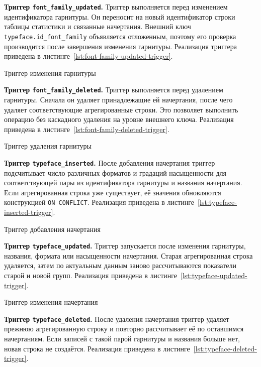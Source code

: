 \textbf{Триггер \texttt{font_family_updated}.}
Триггер выполняется перед изменением идентификатора гарнитуры. Он переносит на
новый идентификатор строки таблицы статистики и связанные начертания. Внешний
ключ \texttt{typeface.id_font_family} объявляется отложенным, поэтому
его проверка производится после завершения изменения гарнитуры. Реализация
триггера приведена в листинге~\ref{lst:font-family-updated-trigger}.

{Триггер изменения гарнитуры}
{\label{lst:font-family-updated-trigger}}

\textbf{Триггер \texttt{font_family_deleted}.}
Триггер выполняется перед удалением гарнитуры. Сначала он удаляет принадлежащие
ей начертания, после чего удаляет соответствующие агрегированные строки. Это
позволяет выполнить операцию без каскадного удаления на уровне внешнего ключа.
Реализация приведена в листинге~\ref{lst:font-family-deleted-trigger}.

{Триггер удаления гарнитуры}
{\label{lst:font-family-deleted-trigger}}

\textbf{Триггер \texttt{typeface_inserted}.}
После добавления начертания триггер подсчитывает число различных форматов и
градаций насыщенности для соответствующей пары из идентификатора гарнитуры и
названия начертания. Если агрегированная строка уже существует, её значения
обновляются конструкцией \texttt{ON CONFLICT}. Реализация приведена в
листинге~\ref{lst:typeface-inserted-trigger}.

{Триггер добавления начертания}
{\label{lst:typeface-inserted-trigger}}

\textbf{Триггер \texttt{typeface_updated}.}
Триггер запускается после изменения гарнитуры, названия, формата или
насыщенности начертания. Старая агрегированная строка удаляется, затем по
актуальным данным заново рассчитываются показатели старой и новой групп.
Реализация приведена в листинге~\ref{lst:typeface-updated-trigger}.

{Триггер изменения начертания}
{\label{lst:typeface-updated-trigger}}

\textbf{Триггер \texttt{typeface_deleted}.}
После удаления начертания триггер удаляет прежнюю агрегированную строку и
повторно рассчитывает её по оставшимся начертаниям. Если записей с такой парой
гарнитуры и названия больше нет, новая строка не создаётся. Реализация
приведена в листинге~\ref{lst:typeface-deleted-trigger}.

